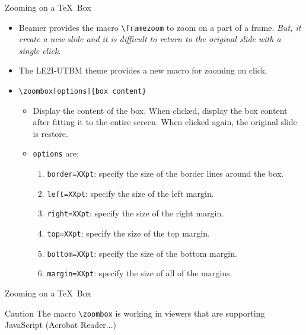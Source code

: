 \documentclass[english,sectioncirclenumberstyle]{le2iutbmbeamer}
\begin{document}
\begin{frame}[t]{Zooming on a \TeX\ Box}
	\begin{itemize}
	\item Beamer provides the macro \texttt{{\textbackslash}framezoom} to zoom on a part of a frame. \emph{But, it create a new slide and it is difficult to return to the original slide with a single click}.	
	\item The LE2I-UTBM theme provides a new macro for zooming on click.
	\item \texttt{{\textbackslash}zoombox[options]\{box content\}}
		\begin{itemize}
		\item Display the content of the box. When clicked, display the box content after fitting it to the entire screen. When clicked again, the original slide is restore.
		\item \texttt{options} are:
			\begin{enumerate}
			\item \texttt{border=XXpt}: specify the size of the border lines around the box.
			\item \texttt{left=XXpt}: specify the size of the left margin.
			\item \texttt{right=XXpt}: specify the size of the right margin.
			\item \texttt{top=XXpt}: specify the size of the top margin.
			\item \texttt{bottom=XXpt}: specify the size of the bottom margin.
			\item \texttt{margin=XXpt}: specify the size of all of the margins.
			\end{enumerate}
		\end{itemize}
	\end{itemize}
\end{frame}

\begin{frame}[t]{Zooming on a \TeX\ Box \insertcontinuationtext}
	\begin{alertblock}{Caution}
	The macro \texttt{{\textbackslash}zoombox} is working in viewers that are supporting JavaScript (Acrobat Reader...)
	\end{alertblock}
	\vspace{1em}
	\begin{center}
	\end{center}
\end{frame}
\end{document}
